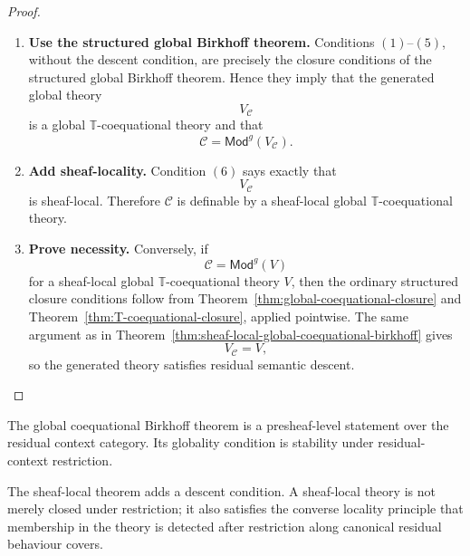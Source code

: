 \begin{proof}
    \leavevmode
    \begin{enumerate}
        \item \textbf{Use the structured global Birkhoff theorem.}
        Conditions \((1)\)--\((5)\), without the descent condition, are
        precisely the closure conditions of the structured global Birkhoff
        theorem. Hence they imply that the generated global theory
        \[
            V_{\mathcal C}
        \]
        is a global \(\mathbb T\)-coequational theory and that
        \[
            \mathcal C=\mathsf{Mod}^{g}(V_{\mathcal C}).
        \]

        \item \textbf{Add sheaf-locality.}
        Condition \((6)\) says exactly that
        \[
            V_{\mathcal C}
        \]
        is sheaf-local. Therefore \(\mathcal C\) is definable by a
        sheaf-local global \(\mathbb T\)-coequational theory.

        \item \textbf{Prove necessity.}
        Conversely, if
        \[
            \mathcal C=\mathsf{Mod}^{g}(V)
        \]
        for a sheaf-local global \(\mathbb T\)-coequational theory \(V\), then
        the ordinary structured closure conditions follow from
        Theorem~\ref{thm:global-coequational-closure} and
        Theorem~\ref{thm:T-coequational-closure}, applied pointwise. The same
        argument as in
        Theorem~\ref{thm:sheaf-local-global-coequational-birkhoff} gives
        \[
            V_{\mathcal C}=V,
        \]
        so the generated theory satisfies residual semantic descent.
    \end{enumerate}
\end{proof}

\begin{remark}
\label{rem:presheaf-level-and-sheaf-level-globality}
    The global coequational Birkhoff theorem is a presheaf-level statement over
    the residual context category. Its globality condition is stability under
    residual-context restriction.

    The sheaf-local theorem adds a descent condition. A sheaf-local theory is
    not merely closed under restriction; it also satisfies the converse
    locality principle that membership in the theory is detected after
    restriction along canonical residual behaviour covers.
\end{remark}

